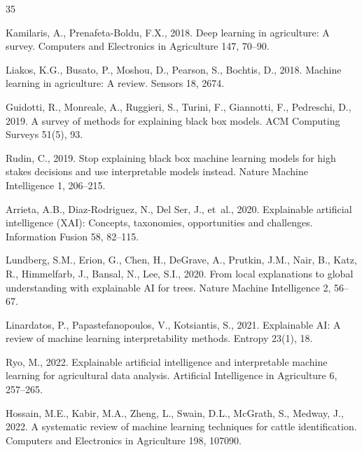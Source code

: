 \documentclass[3p,twocolumn,authoryear]{elsarticle}
\begin{document}
\begin{thebibliography}{35}
{
Kamilaris, A., Prenafeta-Boldu, F.X., 2018.
Deep learning in agriculture: A survey.
Computers and Electronics in Agriculture 147, 70--90.

Liakos, K.G., Busato, P., Moshou, D., Pearson, S., Bochtis, D., 2018.
Machine learning in agriculture: A review.
Sensors 18, 2674.

Guidotti, R., Monreale, A., Ruggieri, S., Turini, F., Giannotti, F.,
  Pedreschi, D., 2019.
A survey of methods for explaining black box models.
ACM Computing Surveys 51(5), 93.

Rudin, C., 2019.
Stop explaining black box machine learning models for high stakes decisions and use interpretable models instead.
Nature Machine Intelligence 1, 206--215.

Arrieta, A.B., Diaz-Rodriguez, N., Del Ser, J., et~al., 2020.
Explainable artificial intelligence (XAI): Concepts, taxonomies, opportunities and challenges.
Information Fusion 58, 82--115.

Lundberg, S.M., Erion, G., Chen, H., DeGrave, A., Prutkin, J.M.,
  Nair, B., Katz, R., Himmelfarb, J., Bansal, N., Lee, S.I., 2020.
From local explanations to global understanding with explainable AI for trees.
Nature Machine Intelligence 2, 56--67.

Linardatos, P., Papastefanopoulos, V., Kotsiantis, S., 2021.
Explainable AI: A review of machine learning interpretability methods.
Entropy 23(1), 18.

Ryo, M., 2022.
Explainable artificial intelligence and interpretable machine learning for agricultural data analysis.
Artificial Intelligence in Agriculture 6, 257--265.

Hossain, M.E., Kabir, M.A., Zheng, L., Swain, D.L., McGrath, S.,
  Medway, J., 2022.
A systematic review of machine learning techniques for cattle identification.
Computers and Electronics in Agriculture 198, 107090.

}
\end{thebibliography}
\end{document}
